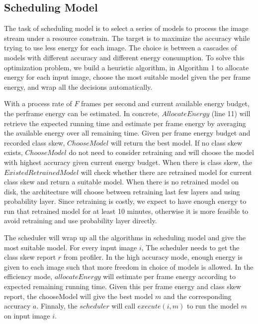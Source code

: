 \documentclass[pageno]{jpaper}
\begin{document}
\subsection{Scheduling Model}
The task of scheduling model is to select a series of models to process the image stream under a resource constrain. The target is to maximize the accuracy while trying to use less energy for each image. The choice is between a cascades of models with different accuracy and different energy consumption. To solve this optimization problem, we build a heuristic algorithm, in Algorithm 1 to allocate energy for each input image, choose the most suitable model given the per frame energy, and wrap all the decisions automatically.

With a process rate of $F$ frames per second and current available energy budget, the perframe energy can be estimated. In concrete, $AllocateEnergy$ (line 11) will retrieve the expected running time and estimate per frame energy by averaging the available energy over all remaining time. Given per frame energy budget and recorded class skew, $ChooseModel$ will return the best model. If no class skew exists, $ChooseModel$ do not need to consider retraining and will choose the model with highest accuracy given current energy budget. When there is class skew, the $ExistedRetrainedModel$ will check whether there are retrained model for current class skew and return a suitable model. When there is no retrained model on disk, the architecture will choose between retraining last few layers and using probability layer. Since retraining is costly, we expect to have enough energy to run that retrained model for at least 10 minutes, otherwise it is more feasible to avoid retraining and use probability layer directly.

The scheduler will wrap up all the algorithms in scheduling model and give the most suitable model. For every input image $i$, The scheduler needs to get the class skew report $r$ from profiler. In the high accuracy mode, enough energy is given to each image such that more freedom in choice of models is allowed. In the efficiency mode, $allocateEnergy$ will estimate per frame energy according to expected remaining running time. Given this per frame energy and class skew report, the chooseModel will give the best model $m$ and the corresponding accuracy $a$. Finnaly, the $scheduler$ will call $execute(i,m)$ to run the model $m$ on input image $i$.
\end{document}

